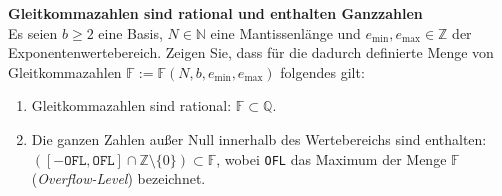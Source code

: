 \textbf{Gleitkommazahlen sind rational und enthalten Ganzzahlen}\\
 Es seien $b\geq 2$ eine Basis, $N\in \mathbb{N}$ eine Mantissenlänge und $e_{\text{min}}, e_{\text{max}} \in \mathbb{Z}$ der Exponentenwertebereich. Zeigen Sie, dass für die dadurch definierte Menge von Gleitkommazahlen $\mathbb{F} := \mathbb{F}(N,b,e_{\text{min}}, e_{\text{max}})$ folgendes gilt:
 \begin{enumerate}
 	\item Gleitkommazahlen sind rational: $\mathbb{F} \subset \mathbb{Q}$.
 	\item Die ganzen Zahlen außer Null innerhalb des Wertebereichs sind enthalten: $\left([-\texttt{OFL}, \texttt{OFL}] \cap \mathbb{Z}\setminus\{0\}\right)\subset \mathbb{F}$, wobei \texttt{OFL} das Maximum der Menge $\mathbb{F}$ (\textit{Overflow-Level}) bezeichnet.
 \end{enumerate}